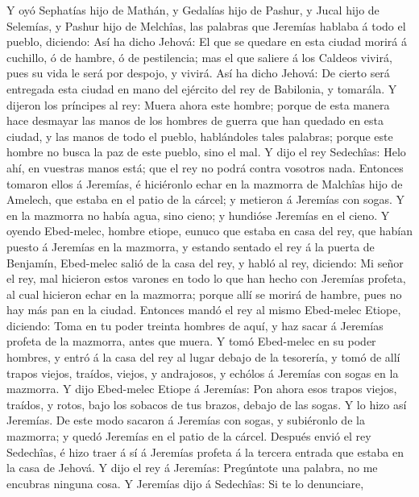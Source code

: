  Y oyó Sephatías hijo de Mathán, y Gedalías hijo de
Pashur, y Jucal hijo de Selemías, y Pashur hijo de Melchîas, las
palabras que Jeremías hablaba á todo el pueblo, diciendo: 
Así ha dicho Jehová: El que se quedare en esta ciudad morirá á cuchillo,
ó de hambre, ó de pestilencia; mas el que saliere á los Caldeos vivirá,
pues su vida le será por despojo, y vivirá.  Así ha dicho
Jehová: De cierto será entregada esta ciudad en mano del ejército del
rey de Babilonia, y tomarála.  Y dijeron los príncipes al
rey: Muera ahora este hombre; porque de esta manera hace desmayar las
manos de los hombres de guerra que han quedado en esta ciudad, y las
manos de todo el pueblo, hablándoles tales palabras; porque este hombre
no busca la paz de este pueblo, sino el mal.  Y dijo el
rey Sedechîas: Helo ahí, en vuestras manos está; que el rey no podrá
contra vosotros nada.  Entonces tomaron ellos á Jeremías,
é hiciéronlo echar en la mazmorra de Malchîas hijo de Amelech, que
estaba en el patio de la cárcel; y metieron á Jeremías con sogas. Y en
la mazmorra no había agua, sino cieno; y hundióse Jeremías en el cieno.
 Y oyendo Ebed-melec, hombre etiope, eunuco que estaba en
casa del rey, que habían puesto á Jeremías en la mazmorra, y estando
sentado el rey á la puerta de Benjamín,  Ebed-melec salió
de la casa del rey, y habló al rey, diciendo:  Mi señor el
rey, mal hicieron estos varones en todo lo que han hecho con Jeremías
profeta, al cual hicieron echar en la mazmorra; porque allí se morirá de
hambre, pues no hay más pan en la ciudad.  Entonces mandó
el rey al mismo Ebed-melec Etiope, diciendo: Toma en tu poder treinta
hombres de aquí, y haz sacar á Jeremías profeta de la mazmorra, antes
que muera.  Y tomó Ebed-melec en su poder hombres, y
entró á la casa del rey al lugar debajo de la tesorería, y tomó de allí
trapos viejos, traídos, viejos, y andrajosos, y echólos á Jeremías con
sogas en la mazmorra.  Y dijo Ebed-melec Etiope á
Jeremías: Pon ahora esos trapos viejos, traídos, y rotos, bajo los
sobacos de tus brazos, debajo de las sogas. Y lo hizo así Jeremías.
 De este modo sacaron á Jeremías con sogas, y subiéronlo
de la mazmorra; y quedó Jeremías en el patio de la cárcel.
 Después envió el rey Sedechîas, é hizo traer á sí á
Jeremías profeta á la tercera entrada que estaba en la casa de Jehová. Y
dijo el rey á Jeremías: Pregúntote una palabra, no me encubras ninguna
cosa.  Y Jeremías dijo á Sedechîas: Si te lo denunciare,
